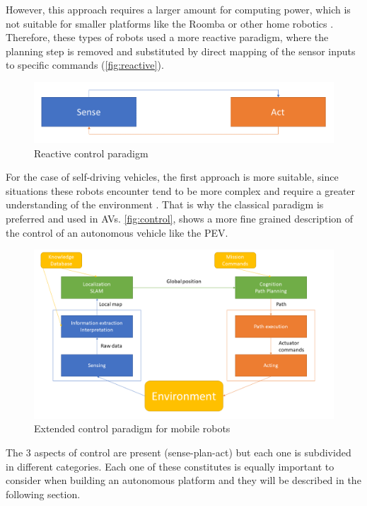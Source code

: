 However, this approach requires a larger amount for computing power, which is not suitable for smaller platforms like the Roomba or other home robotics . Therefore, these types of robots used a more reactive paradigm, where the planning step is removed and substituted by direct mapping of the sensor inputs to specific commands (\autoref{fig:reactive}).

\begin{figure}[htb]
  \centering
  \includegraphics[width=.9\linewidth]{pictures/02/reactive}
  \caption{Reactive control paradigm}
  \label{fig:reactive}
\end{figure}

For the case of self-driving vehicles, the first approach is more suitable, since situations these robots encounter tend to be more complex and require a greater understanding of the environment . That is why the classical paradigm is preferred and used in AVs. \autoref{fig:control}, shows a more fine grained description of the control of an autonomous vehicle like the PEV.

\begin{figure}[htb]
  \centering
  \includegraphics[width=\linewidth]{pictures/02/control}
  \caption{Extended control paradigm for mobile robots}
  \label{fig:control}
\end{figure}

The 3 aspects of control are present (sense-plan-act) but each one is subdivided in different categories. Each one of these constitutes is equally important to consider when building an autonomous platform and they will be described in the following section.

